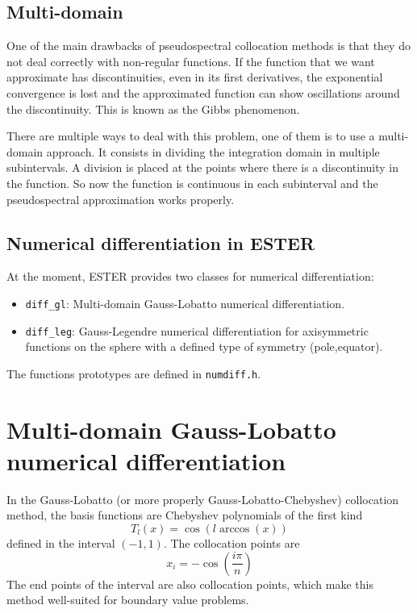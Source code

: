\subsection{Multi-domain}

One of the main drawbacks of pseudospectral collocation methods is that they do not deal correctly
with non-regular functions. If the function that we want approximate has discontinuities, even in its
first derivatives, the exponential convergence is lost and the approximated function can show oscillations
around the discontinuity. This is known as the Gibbs phenomenon. 

There are multiple ways to deal with this problem, one of them is to use a multi-domain approach. 
It consists in dividing the integration domain in multiple subintervals. A division is placed at
the points where there is a discontinuity in the function. So now the function is continuous
in each subinterval and the pseudospectral approximation works properly.

\subsection{Numerical differentiation in ESTER}

At the moment, ESTER provides two classes for numerical differentiation:
\begin{itemize}
\item {\tt diff\_gl}: Multi-domain Gauss-Lobatto numerical differentiation.
\item {\tt diff\_leg}: Gauss-Legendre numerical differentiation for axisymmetric functions on the sphere 
with a defined type of symmetry (pole,equator). 
\end{itemize}
The functions prototypes are defined in {\tt numdiff.h}.

\section{Multi-domain Gauss-Lobatto numerical differentiation}

In the Gauss-Lobatto (or more properly Gauss-Lobatto-Chebyshev) collocation method, the basis functions
are Chebyshev polynomials of the first kind
$$T_l(x)=\cos(l\arccos(x))$$
defined in the interval $(-1,1)$. The collocation points are
$$x_i=-\cos(\frac{i\pi}{n})$$
The end points of the interval are also collocation points, which make this method
well-suited for boundary value problems.

